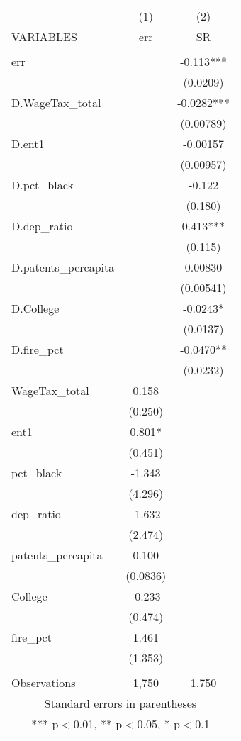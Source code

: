 \begin{tabular}{lcc} \hline
 & (1) & (2) \\
VARIABLES & err & SR \\ \hline
 &  &  \\
err &  & -0.113*** \\
 &  & (0.0209) \\
D.WageTax\_total &  & -0.0282*** \\
 &  & (0.00789) \\
D.ent1 &  & -0.00157 \\
 &  & (0.00957) \\
D.pct\_black &  & -0.122 \\
 &  & (0.180) \\
D.dep\_ratio &  & 0.413*** \\
 &  & (0.115) \\
D.patents\_percapita &  & 0.00830 \\
 &  & (0.00541) \\
D.College &  & -0.0243* \\
 &  & (0.0137) \\
D.fire\_pct &  & -0.0470** \\
 &  & (0.0232) \\
WageTax\_total & 0.158 &  \\
 & (0.250) &  \\
ent1 & 0.801* &  \\
 & (0.451) &  \\
pct\_black & -1.343 &  \\
 & (4.296) &  \\
dep\_ratio & -1.632 &  \\
 & (2.474) &  \\
patents\_percapita & 0.100 &  \\
 & (0.0836) &  \\
College & -0.233 &  \\
 & (0.474) &  \\
fire\_pct & 1.461 &  \\
 & (1.353) &  \\
 &  &  \\
 Observations & 1,750 & 1,750 \\ \hline
\multicolumn{3}{c}{ Standard errors in parentheses} \\
\multicolumn{3}{c}{ *** p$<$0.01, ** p$<$0.05, * p$<$0.1} \\
\end{tabular}
